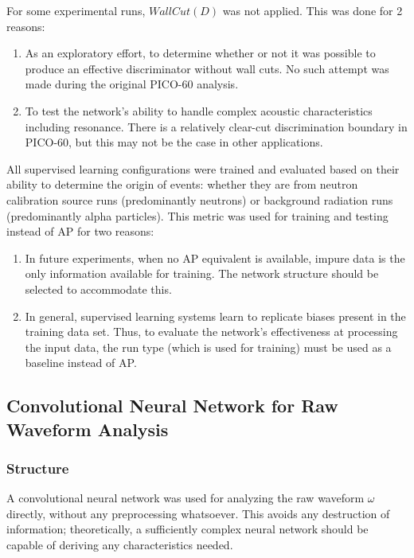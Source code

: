 \documentclass[10pt]{article}
\begin{document}
For some experimental runs, $WallCut(D)$ was not applied. This was done for 2 reasons:

\begin{enumerate}
    \item As an exploratory effort, to determine whether or not it was possible to produce an effective discriminator without wall cuts. No such attempt was made during the original PICO-60 analysis.
    \item To test the network's ability to handle complex acoustic characteristics including resonance. There is a relatively clear-cut discrimination boundary in PICO-60, but this may not be the case in other applications.
\end{enumerate}

All supervised learning configurations were trained and evaluated based on their ability to determine the origin of events: whether they are from neutron calibration source runs (predominantly neutrons) or background radiation runs (predominantly alpha particles). This metric was used for training and testing instead of AP for two reasons:

\begin{enumerate}
    \item In future experiments, when no AP equivalent is available, impure data is the only information available for training. The network structure should be selected to accommodate this.
    \item In general, supervised learning systems learn to replicate biases present in the training data set. Thus, to evaluate the network's effectiveness at processing the input data, the run type (which is used for training) must be used as a baseline instead of AP.
\end{enumerate}

\subsection{Convolutional Neural Network for Raw Waveform Analysis}

\subsubsection{Structure}

A convolutional neural network was used for analyzing the raw waveform $\omega$ directly, without any preprocessing whatsoever. This avoids any destruction of information; theoretically, a sufficiently complex neural network should be capable of deriving any characteristics needed.
\end{document}
